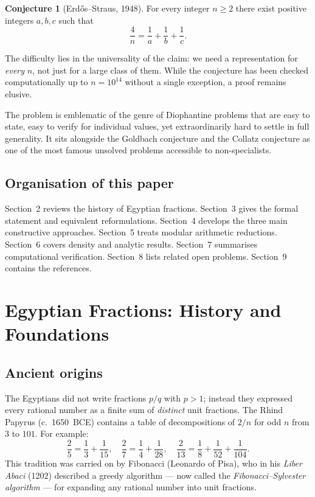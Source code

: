 \documentclass[12pt,a4paper]{amsart}
\theoremstyle{definition}
\newtheorem{conjecture}[theorem]{Conjecture}
\begin{document}
\begin{conjecture}[Erd\H{o}s--Straus, 1948]\label{conj:ES}
For every integer $n \geq 2$ there exist positive integers $a, b, c$ such that
\[
  \frac{4}{n} = \frac{1}{a} + \frac{1}{b} + \frac{1}{c}.
\]
\end{conjecture}

The difficulty lies in the universality of the claim: we need a
representation for \emph{every} $n$, not just for a large class of them.
While the conjecture has been checked computationally up to $n = 10^{14}$
without a single exception, a proof remains elusive.

The problem is emblematic of the genre of Diophantine problems that are
easy to state, easy to verify for individual values, yet extraordinarily
hard to settle in full generality.  It sits alongside the Goldbach
conjecture and the Collatz conjecture as one of the most famous unsolved
problems accessible to non-specialists.

\subsection*{Organisation of this paper}

Section~2 reviews the history of Egyptian fractions.  Section~3 gives the
formal statement and equivalent reformulations.  Section~4 develops the
three main constructive approaches.  Section~5 treats modular arithmetic
reductions.  Section~6 covers density and analytic results.
Section~7 summarises computational verification.  Section~8 lists
related open problems.  Section~9 contains the references.

\section{Egyptian Fractions: History and Foundations}

\subsection{Ancient origins}

The Egyptians did not write fractions $p/q$ with $p > 1$; instead they
expressed every rational number as a finite sum of \emph{distinct} unit
fractions.  The Rhind Papyrus (c.\ 1650~BCE) contains a table of
decompositions of $2/n$ for odd $n$ from $3$ to $101$.  For example:
\[
  \frac{2}{5} = \frac{1}{3} + \frac{1}{15}, \quad
  \frac{2}{7} = \frac{1}{4} + \frac{1}{28}, \quad
  \frac{2}{13} = \frac{1}{8} + \frac{1}{52} + \frac{1}{104}.
\]
This tradition was carried on by Fibonacci (Leonardo of Pisa), who in his
\emph{Liber Abaci} (1202) described a greedy algorithm --- now called the
\emph{Fibonacci--Sylvester algorithm} --- for expanding any rational
number into unit fractions.
\end{document}
